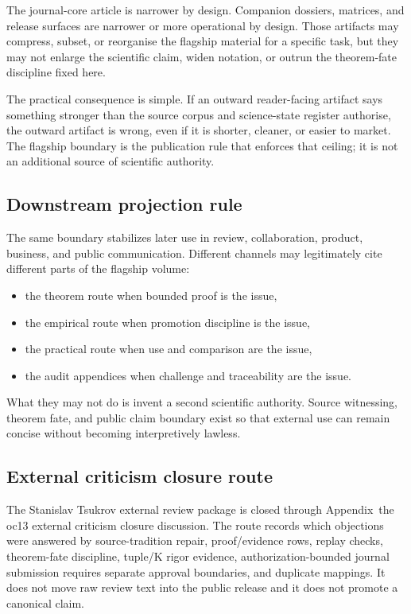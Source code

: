 The journal-core article is narrower by design. Companion dossiers, matrices,
and release surfaces are narrower or more operational by design. Those
artifacts may compress, subset, or reorganise the flagship material for a
specific task, but they may not enlarge the scientific claim, widen notation,
or outrun the theorem-fate discipline fixed here.

The practical consequence is simple. If an outward reader-facing artifact says
something stronger than the source corpus and science-state register authorise, the outward
artifact is wrong, even if it is shorter, cleaner, or easier to market. The
flagship boundary is the publication rule that enforces that ceiling; it is
not an additional source of scientific authority.

\subsection{Downstream projection rule}

The same boundary stabilizes later use in review, collaboration, product,
business, and public communication. Different channels may legitimately cite
different parts of the flagship volume:

\begin{itemize}
\item the theorem route when bounded proof is the issue,
\item the empirical route when promotion discipline is the issue,
\item the practical route when use and comparison are the issue,
\item the audit appendices when challenge and traceability are the issue.
\end{itemize}

What they may not do is invent a second scientific authority. Source witnessing,
theorem fate, and public claim boundary exist so that external use can remain
concise without becoming interpretively lawless.

\subsection{External criticism closure route}
\label{sec:oc13-source-audit-external-criticism-closure}

The Stanislav Tsukrov external review package is closed through Appendix~the oc13 external criticism closure discussion. The route records which objections were answered by source-tradition repair, proof/evidence rows, replay checks, theorem-fate discipline, tuple/K rigor evidence, authorization-bounded journal submission requires separate approval boundaries, and duplicate mappings. It does not move raw review text into the public release and it does not promote a canonical claim.

